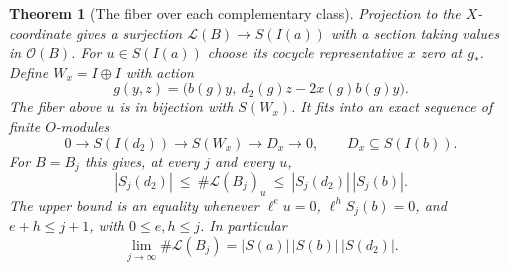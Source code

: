 \documentclass[a4paper,11pt]{article}
\newtheorem{theorem}[proposition]{Theorem}
\theoremstyle{definition}
\theoremstyle{remark}
\numberwithin{equation}{section}
\begin{document}
\begin{theorem}[The fiber over each complementary class]
\label{thm:lowerfibers384}
Projection to the \(X\)-coordinate gives a surjection
\(\mathcal L(B)\to S(I(a))\) with a section taking values in
\(\mathcal O(B)\). For \(u\in S(I(a))\) choose its cocycle
representative \(x\) zero at \(g_*\). Define \(W_x=I\oplus I\)
with action
\[
 g(y,z)=\bigl(b(g)y,\ d_2(g)z-2x(g)b(g)y\bigr).
\]
The fiber above \(u\) is in bijection with \(S(W_x)\). It fits
into an exact sequence of finite \(O\)-modules
\[
 0\longrightarrow S(I(d_2))\longrightarrow S(W_x)
       \longrightarrow D_x\longrightarrow 0,\qquad
 D_x\subseteq S(I(b)).
\]
For \(B=B_j\) this gives, at every \(j\) and every \(u\),
\[
 |S_j(d_2)|\ \le\ \#\mathcal L(B_j)_u
       \ \le\ |S_j(d_2)|\,|S_j(b)|.
\]
The upper bound is an equality whenever
\(\ell^e u=0\), \(\ell^h S_j(b)=0\), and \(e+h\le j+1\),
with \(0\le e,h\le j\). In particular
\[
 \lim_{j\to\infty}\#\mathcal L(B_j)
       = |S(a)|\,|S(b)|\,|S(d_2)|.
\]
\end{theorem}
\end{document}
